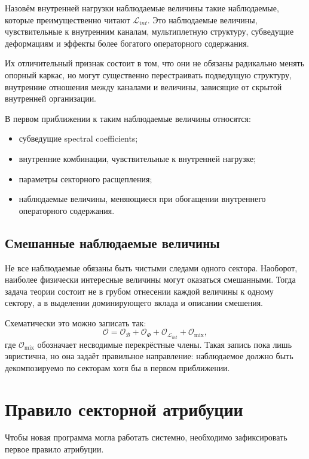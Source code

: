 \documentclass[12pt,a4paper]{article}
\begin{document}
Назовём внутренней нагрузки наблюдаемые величины такие наблюдаемые, которые преимущественно читают \(\mathcal{L}_{int}\). Это наблюдаемые величины, чувствительные к внутренним каналам, мультиплетную структуру, субведущие деформациям и эффекты более богатого операторного содержания.

Их отличительный признак состоит в том, что они не обязаны радикально менять опорный каркас, но могут существенно перестраивать подведущую структуру, внутренние отношения между каналами и величины, зависящие от скрытой внутренней организации.

В первом приближении к таким наблюдаемые величины относятся:
\begin{itemize}
    \item субведущие spectral coefficients;
    \item внутренние комбинации, чувствительные к внутренней нагрузке;
    \item параметры секторного расщепления;
    \item наблюдаемые величины, меняющиеся при обогащении внутреннего операторного содержания.
\end{itemize}

\subsection{Смешанные наблюдаемые величины}

Не все наблюдаемые обязаны быть чистыми следами одного сектора. Наоборот, наиболее физически интересные величины могут оказаться смешанными. Тогда задача теории состоит не в грубом отнесении каждой величины к одному сектору, а в выделении доминирующего вклада и описании смешения.

Схематически это можно записать так:
\begin{equation}
\mathcal{O} = \mathcal{O}_{\mathcal{B}} + \mathcal{O}_{\Phi} + \mathcal{O}_{\mathcal{L}_{int}} + \mathcal{O}_{\mathrm{mix}},
\end{equation}
где \(\mathcal{O}_{\mathrm{mix}}\) обозначает несводимые перекрёстные члены. Такая запись пока лишь эвристична, но она задаёт правильное направление: наблюдаемое должно быть декомпозируемо по секторам хотя бы в первом приближении.

\section{Правило секторной атрибуции}

Чтобы новая программа могла работать системно, необходимо зафиксировать первое правило атрибуции.
\end{document}
